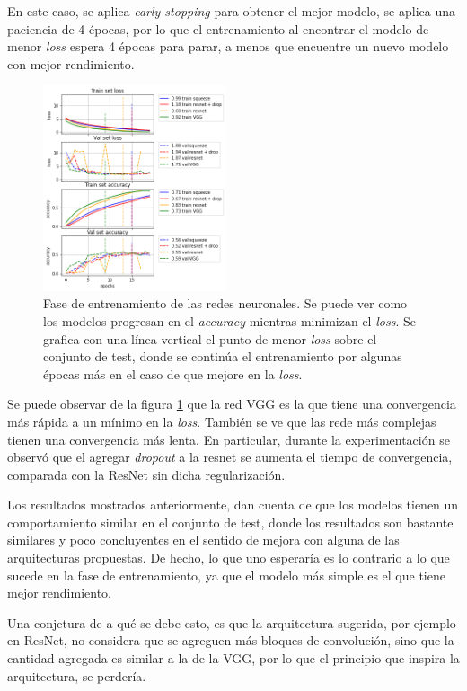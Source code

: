     En este caso, se aplica \textit{early stopping} para obtener el mejor modelo, se aplica una paciencia de 4 épocas, por lo que el entrenamiento al encontrar el modelo de menor \textit{loss} espera 4 épocas para parar, a menos que encuentre un nuevo modelo con mejor rendimiento.
    
    \begin{figure}[t]
        \centering
        \includegraphics[width=0.48\textwidth]{img/train_plot.png}
        \caption{Fase de entrenamiento de las redes neuronales. Se puede ver como los modelos progresan en el \textit{accuracy} mientras minimizan el \textit{loss}. Se grafica con una línea vertical el punto de menor \textit{loss} sobre el conjunto de test, donde se continúa el entrenamiento por algunas épocas más en el caso de que mejore en la \textit{loss}.}
        \label{fig:train_plot}
    \end{figure}
    
    Se puede observar de la figura \ref{fig:train_plot} que la red VGG es la que tiene una convergencia más rápida a un mínimo en la \textit{loss}. También se ve que las rede más complejas tienen una convergencia más lenta. En particular, durante la experimentación se observó que el agregar \textit{dropout} a la resnet se aumenta el tiempo de convergencia, comparada con la ResNet sin dicha regularización.
    
    Los resultados mostrados anteriormente, dan cuenta de que los modelos tienen un comportamiento similar en el conjunto de test, donde los resultados son bastante similares y poco concluyentes en el sentido de mejora con alguna de las arquitecturas propuestas. De hecho, lo que uno esperaría es lo contrario a lo que sucede en la fase de entrenamiento, ya que el modelo más simple es el que tiene mejor rendimiento.
    
    Una conjetura de a qué se debe esto, es que la arquitectura sugerida, por ejemplo en ResNet, no considera que se agreguen más bloques de convolución, sino que la cantidad agregada es similar a la de la VGG, por lo que el principio que inspira la arquitectura, se perdería.
    
